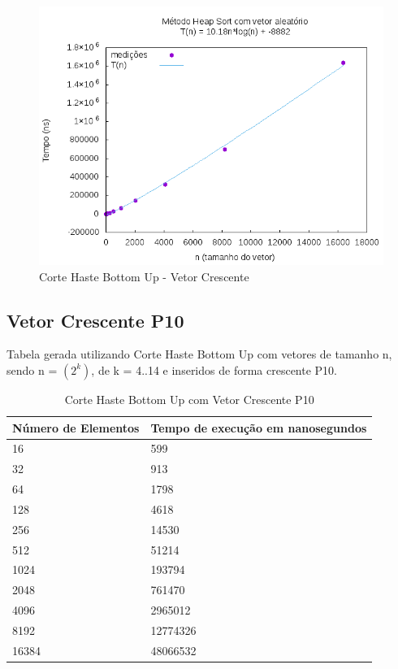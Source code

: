 \documentclass[12pt,a4paper,twoside]{report}
\begin{document}
\begin{figure}[H]
    \centering
    \includegraphics[width=0.7\linewidth]{graficos/HeapSort/vIntAleatorio/vIntAleatorio.png}
  \caption{Corte Haste Bottom Up - Vetor Crescente}
\end{figure}


\subsection{Vetor Crescente P10}
Tabela gerada utilizando Corte Haste Bottom Up com vetores de tamanho n, sendo n = $(2^k)$, de k = 4..14 e inseridos de forma crescente P10.
\begin{table}[H]
\centering
\caption{Corte Haste Bottom Up com Vetor Crescente P10}
\label{my-label}
\begin{tabular}{|l|l|}
\hline
\multicolumn{1}{|c|}{\textbf{Número de Elementos}} & \multicolumn{1}{c|}{\textbf{Tempo de execução em nanosegundos}} \\ \hline
16 & 599 \\ \hline
32 & 913 \\ \hline
64 & 1798 \\ \hline
128 & 4618 \\ \hline
256 & 14530 \\ \hline
512 & 51214 \\ \hline
1024 & 193794 \\ \hline
2048 & 761470 \\ \hline
4096 & 2965012 \\ \hline
8192 & 12774326 \\ \hline
16384 & 48066532 \\ \hline
\end{tabular}
\end{table}
\end{document}
